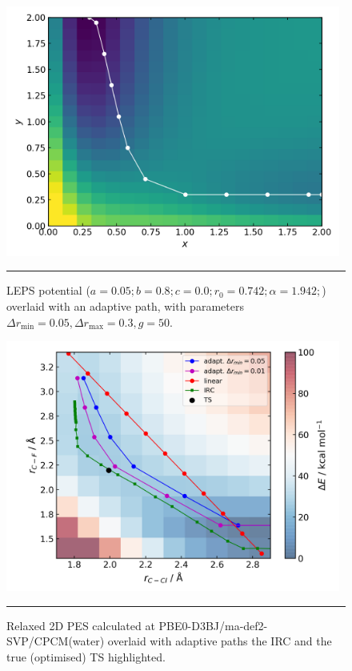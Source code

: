 \documentclass[../../main.tex]{subfiles}
\begin{document}
\begin{figure}[h!]
	\vspace{0.4cm}
	\centering
	\includegraphics[width=11cm]{5/further/figs/fig2/fig2.png}
	\vspace{0.2cm}
	\hrule
	\caption{LEPS potential ($a = 0.05;
		b = 0.8;
		c = 0.0;
		r_0 = 0.742;
		\alpha = 1.942;$) overlaid with an adaptive path, with parameters
		$\Delta r_\text{min} = 0.05, \Delta r_\text{max} = 0.3, g = 50$.}
	\label{fig::ade_further_2}
\end{figure}



\begin{figure}[h!]
	\vspace{0.4cm}
	\centering
	\includegraphics[width=11cm]{5/further/figs/fig3/fig3.png}
	\vspace{0.2cm}
	\hrule
	\caption{Relaxed 2D PES calculated at PBE0-D3BJ/ma-def2-SVP/CPCM(water) overlaid with adaptive paths the IRC and the true (optimised) TS highlighted.}
	\label{fig::ade_further_3}
\end{figure}
\end{document}
